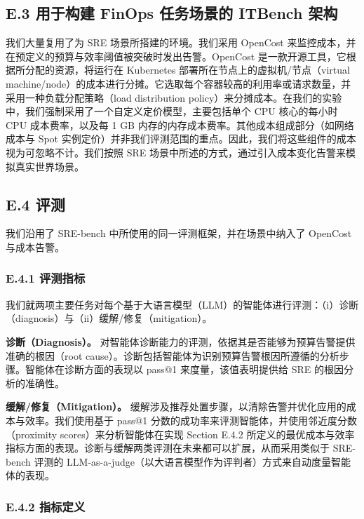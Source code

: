 \subsection{E.3 用于构建 FinOps 任务场景的 ITBench 架构}

我们大量复用了为 SRE 场景所搭建的环境。我们采用 OpenCost 来监控成本，并在预定义的预算与效率阈值被突破时发出告警。OpenCost 是一款开源工具，它根据所分配的资源，将运行在 Kubernetes 部署所在节点上的虚拟机/节点（virtual machine/node）的成本进行分摊。它选取每个容器较高的利用率或请求数量，并采用一种负载分配策略（load distribution policy）来分摊成本。在我们的实验中，我们强制采用了一个自定义定价模型，主要包括单个 CPU 核心的每小时 CPU 成本费率，以及每 1 GB 内存的内存成本费率。其他成本组成部分（如网络成本与 Spot 实例定价）并非我们评测范围的重点。因此，我们将这些组件的成本视为可忽略不计。我们按照 SRE 场景中所述的方式，通过引入成本变化告警来模拟真实世界场景。

\subsection{E.4 评测}

我们沿用了 SRE-bench 中所使用的同一评测框架，并在场景中纳入了 OpenCost 与成本告警。

\subsubsection*{E.4.1 评测指标}

我们就两项主要任务对每个基于大语言模型（LLM）的智能体进行评测：（i）诊断（diagnosis）与（ii）缓解/修复（mitigation）。

\textbf{诊断（Diagnosis）。} 对智能体诊断能力的评测，依据其是否能够为预算告警提供准确的根因（root cause）。诊断包括智能体为识别预算告警根因所遵循的分析步骤。智能体在诊断方面的表现以 pass@1 来度量，该值表明提供给 SRE 的根因分析的准确性。

\textbf{缓解/修复（Mitigation）。} 缓解涉及推荐处置步骤，以清除告警并优化应用的成本与效率。我们使用基于 pass@1 分数的成功率来评测智能体，并使用邻近度分数（proximity scores）来分析智能体在实现 Section E.4.2 所定义的最优成本与效率指标方面的表现。诊断与缓解两类评测在未来都可以扩展，从而采用类似于 SRE-bench 评测的 LLM-as-a-judge（以大语言模型作为评判者）方式来自动度量智能体的表现。

\subsubsection*{E.4.2 指标定义}

